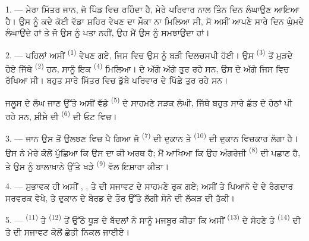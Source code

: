 
\VUsaut{4.0mm}
\VUsaut{3.0mm}

\VUsaut{3.0mm}

1. --- ਮੇਰਾ ਮਿੱਤਰ ਜਾਨ, ਜੋ ਪਿੰਡ ਵਿਚ ਰਹਿੰਦਾ ਹੈ, ਮੇਰੇ ਪਰਿਵਾਰ ਨਾਲ ਤਿੰਨ ਦਿਨ ਲੰਘਾਉਣ
ਆਇਆ ਹੈ।  ਉਸ ਨੂੰ ਕਦੇ ਕੋਈ ਵੱਡਾ ਸ਼ਹਿਰ ਵੇਖਣ ਦਾ ਮੌਕਾ ਨਾ ਮਿਲਿਆ ਸੀ, ਸੋ
ਅਸੀਂ ਆਪਣੇ ਸਾਰੇ ਦਿਨ ਘੁੰਮਦੇ ਲੰਘਾਉਂਦੇ ਹਾਂ ਤੇ ਜੋ ਉਸ ਨੂੰ ਪਤਾ ਨਹੀਂ, ਉਹ ਮੈਂ ਉਸ ਨੂੰ
ਸਮਝਾਉਂਦਾ ਹਾਂ।

2. --- ਪਹਿਲਾਂ ਅਸੀਂ  \textsuperscript{(1)} ਵੇਖਣ ਗਏ, ਜਿਸ ਵਿਚ ਉਸ ਨੂੰ
ਬੜੀ ਦਿਲਚਸਪੀ ਹੋਈ। ਉਸ  \textsuperscript{(3)} ਤੋਂ ਮੁੜਦੇ ਹੋਏ ਜਿੱਥੇ
 \textsuperscript{(2)} ਹਨ, ਸਾਨੂੰ ਇਕ 
\textsuperscript{(4)} ਮਿਲਿਆ।  ਦੇ ਅੱਗੇ ਅੱਗੇ
 ਤੁਰ ਰਹੇ ਸਨ, ਉਸ  ਦੇ ਅੱਗੇ ਜਿਸ ਵਿਚ
 ਰੱਖਿਆ ਸੀ। ਬਹੁਤ ਸਾਰੇ ਮਿੱਤਰ  ਵਿਚ ਡੁੱਬੇ ਪਰਿਵਾਰ ਦੇ ਪਿੱਛੇ
ਤੁਰ ਰਹੇ ਸਨ।

ਜਲੂਸ ਦੇ ਲੰਘ ਜਾਣ ਉੱਤੇ ਅਸੀਂ ਵੱਡੇ  \textsuperscript{(5)} ਦੇ ਸਾਹਮਣੇ
ਸੜਕ ਲੰਘੀ, ਜਿੱਥੇ ਬਹੁਤ ਸਾਰੇ  ਛੱਤ ਦੇ ਹੇਠਾਂ  ਪੀ ਰਹੇ ਸਨ,
ਸ਼ੀਸ਼ੇ ਦੀ  \textsuperscript{(6)} ਦੀ ਓਟ ਵਿਚ।

3. --- ਜਾਨ ਉਸ  ਤੋਂ ਉਲਝਣ ਵਿਚ ਪੈ ਗਿਆ ਜੋ  \textsuperscript{(7)} ਦੀ ਦੁਕਾਨ ਤੇ 
\textsuperscript{(10)} ਦੀ ਦੁਕਾਨ ਵਿਚਕਾਰ ਲੱਗਾ ਹੈ। ਉਸ ਨੇ ਮੇਰੇ ਕੋਲੋਂ ਪੁੱਛਿਆ ਕਿ ਉਸ ਦਾ ਕੀ
ਅਰਥ ਹੈ; ਮੈਂ ਆਖਿਆ ਕਿ ਉਹ ਅੰਗਰੇਜ਼ੀ  \textsuperscript{(8)} ਦੀ ਪਛਾਣ
ਹੈ, ਤੇ ਉਸ ਨੂੰ ਬਾਲਾਖ਼ਾਨੇ ਉੱਤੇ ਖੜੇ  \textsuperscript{(9)} ਵੱਲ ਇਸ਼ਾਰਾ
ਕੀਤਾ।

\VUsaut{3.0mm}

4. --- ਸੁਭਾਵਕ ਹੀ ਅਸੀਂ , ,
 ਤੇ  ਦੀ ਸਜਾਵਟ ਦੇ ਸਾਹਮਣੇ ਰੁਕ ਗਏ; ਅਸੀਂ
 ਤੇ ਪਿਆਨੋ ਦੇ  ਦੇ ਰੰਗਦਾਰ ਸਰਵਰਕ ਵੇਖੇ, ਤੇ ਦੁਕਾਨ
ਦੇ ਬੋਰਡ ਦੇ ਤੌਰ ਉੱਤੇ ਲੱਗੀ ਸੋਨੇ ਦੀ ਲੱਕੜ ਦੀ  ਤੱਕੀ।

5. ---  \textsuperscript{(11)} ਤੇ
 \textsuperscript{(12)} ਤੋਂ ਉੱਠੇ ਧੂੜ ਦੇ ਬੱਦਲਾਂ ਨੇ ਸਾਨੂੰ ਮਜਬੂਰ
ਕੀਤਾ ਕਿ ਅਸੀਂ  \textsuperscript{(13)} ਦੇ ਸੋਹਣੇ
 ਤੇ  \textsuperscript{(14)} ਦੀ
 ਤੇ  ਦੀ ਸਜਾਵਟ ਕੋਲੋਂ ਛੇਤੀ ਨਿਕਲ ਜਾਈਏ।

